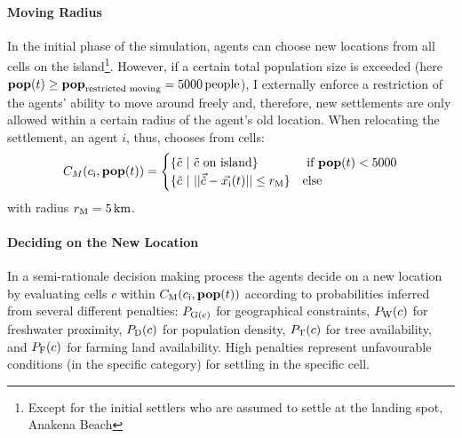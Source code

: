 \paragraph{Moving Radius}
In the initial phase of the simulation, agents can choose new locations from all cells on the island\footnote{Except for the initial settlers who are assumed to settle at the landing spot, Anakena Beach}.
However, if a certain total population size is exceeded (here $\mathbf{pop}(t)\geq \mathbf{pop}_\text{restricted moving} = 5000 \, \rm{people}$), I externally enforce a restriction of the agents' ability to move around freely and, therefore, new settlements are only allowed within a certain radius of the agent's old location.
When relocating the settlement, an agent $i$, thus, chooses from cells:
\begin{equation}
C_{M}(c_{\rm i}, \mathbf{pop}(t)) = 
\begin{cases}
\{\tilde{c} \ | \ \tilde{c}\text{ on island}\} & \text{ if } \mathbf{pop}(t) <5000 \\
\{\tilde{c} \ | \ | | \vec{\tilde{c}} - \vec{x_{\rm i}}(t) | |
\leq r_{\rm M} \} & \text{else} 
\end{cases}
\end{equation}
with radius $r_{\rm M} = 5\, {\rm km}$.

\paragraph{Deciding on the New Location}
In a semi-rationale decision making process the agents decide on a new location by evaluating cells $c$ within $C_{\rm M} (c_{\rm i}, \mathbf{pop}(t))$ according to probabilities inferred from several different penalties:
$P_{\rm G(c)}$ for geographical constraints, $P_{\rm W}(c)$ for freshwater proximity, $P_{\rm D}(c)$ for population density, $P_{\rm T}(c)$ for tree availability, and $P_{\rm F}(c)$ for farming land availability.
High penalties represent unfavourable conditions (in the specific category) for settling in the specific cell.


